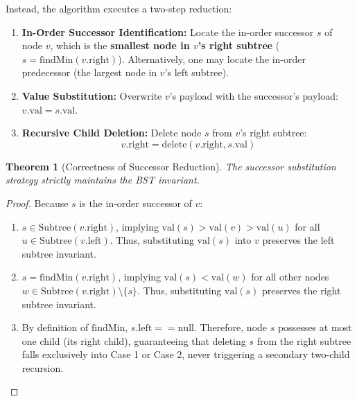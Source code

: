 \documentclass[10pt,journal,compsoc,onecolumn]{IEEEtran}
\newtheorem{theorem}{Theorem}
\begin{document}
Instead, the algorithm executes a two-step reduction:
\begin{enumerate}
    \item \textbf{In-Order Successor Identification:} Locate the in-order successor $s$ of node $v$, which is the \textbf{smallest node in $v$'s right subtree} ($s = \mathrm{findMin}(v.\mathrm{right})$). Alternatively, one may locate the in-order predecessor (the largest node in $v$'s left subtree).
    \item \textbf{Value Substitution:} Overwrite $v$'s payload with the successor's payload: $v.\mathrm{val} = s.\mathrm{val}$.
    \item \textbf{Recursive Child Deletion:} Delete node $s$ from $v$'s right subtree:
    \begin{equation}
        v.\mathrm{right} = \mathrm{delete}(v.\mathrm{right}, s.\mathrm{val})
    \end{equation}
\end{enumerate}

\begin{theorem}[Correctness of Successor Reduction]
The successor substitution strategy strictly maintains the BST invariant.
\end{theorem}
\begin{proof}
Because $s$ is the in-order successor of $v$:
\begin{enumerate}
    \item $s \in \mathrm{Subtree}(v.\mathrm{right})$, implying $\mathrm{val}(s) > \mathrm{val}(v) > \mathrm{val}(u)$ for all $u \in \mathrm{Subtree}(v.\mathrm{left})$. Thus, substituting $\mathrm{val}(s)$ into $v$ preserves the left subtree invariant.
    \item $s = \mathrm{findMin}(v.\mathrm{right})$, implying $\mathrm{val}(s) < \mathrm{val}(w)$ for all other nodes $w \in \mathrm{Subtree}(v.\mathrm{right}) \setminus \{s\}$. Thus, substituting $\mathrm{val}(s)$ preserves the right subtree invariant.
    \item By definition of $\mathrm{findMin}$, $s.\mathrm{left} == \mathrm{null}$. Therefore, node $s$ possesses at most one child (its right child), guaranteeing that deleting $s$ from the right subtree falls exclusively into Case 1 or Case 2, never triggering a secondary two-child recursion.
\end{enumerate}
\end{proof}
\end{document}
